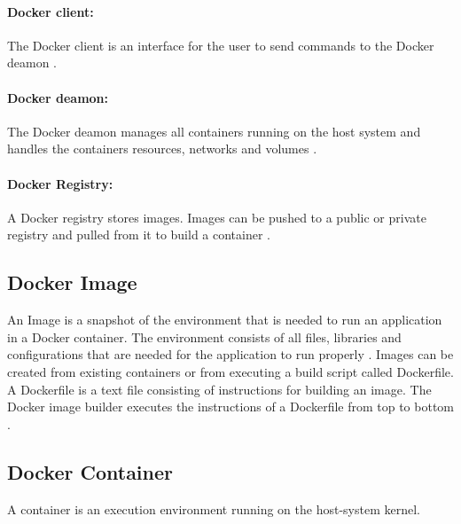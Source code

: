\paragraph{Docker client:} The Docker client is an interface for the user to send commands to the Docker deamon \cite{Docker2020Docs}.


\paragraph{Docker deamon:} The Docker deamon manages all containers running on the host system and handles the containers resources, networks and volumes \cite{Bullington2020Docker}.


\paragraph{Docker Registry:} A Docker registry stores images. Images can be pushed to a public or private registry and pulled from it to build a container \cite{Docker2020Docs}.


\subsection{Docker Image}
\label{subsec:04_docker_image}
An Image is a snapshot of the environment that is needed to run an application in a Docker container. The environment consists of all files, libraries and configurations that are needed for the application to run properly \cite{Docker2020Docs, Nickoloff2019Docker}.
Images can be created from existing containers or from executing a build script called Dockerfile. A Dockerfile is a text file consisting of instructions for building an image. The Docker image builder executes the instructions of a Dockerfile from top to bottom \cite{Nickoloff2019Docker}.


\subsection{Docker Container}
A container is an execution environment running on the host-system kernel.

